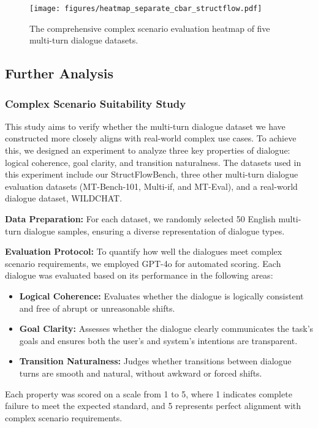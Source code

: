 \begin{figure*}[htbp]
    \captionsetup{skip=0pt}
	\centering
	\texttt{[image: figures/heatmap\_separate\_cbar\_structflow.pdf]}
	\caption{The comprehensive complex scenario evaluation heatmap of five multi-turn dialogue datasets.}
	\label{fig:heatmap}
\end{figure*}

\subsection{Further Analysis}

\subsubsection{Complex Scenario Suitability Study}
This study aims to verify whether the multi-turn dialogue dataset we have constructed more closely aligns with real-world complex use cases.
To achieve this, we designed an experiment to analyze three key properties of dialogue: logical coherence, goal clarity, and transition naturalness. 
The datasets used in this experiment include our StructFlowBench, three other multi-turn dialogue evaluation datasets (MT-Bench-101, Multi-if, and MT-Eval), and a real-world dialogue dataset, WILDCHAT.

\textbf{Data Preparation:} For each dataset, we randomly selected 50 English multi-turn dialogue samples, ensuring a diverse representation of dialogue types.

\textbf{Evaluation Protocol:} To quantify how well the dialogues meet complex scenario requirements, we employed GPT-4o for automated scoring. 
Each dialogue was evaluated based on its performance in the following areas:
\vspace{-.1in}
\begin{itemize}
    \setlength{\itemsep}{0pt}
    \setlength{\parskip}{0pt}
    \item \textbf{Logical Coherence:} Evaluates whether the dialogue is logically consistent and free of abrupt or unreasonable shifts.
    \item \textbf{Goal Clarity:} Assesses whether the dialogue clearly communicates the task's goals and ensures both the user’s and system’s intentions are transparent.
    \item \textbf{Transition Naturalness:} Judges whether transitions between dialogue turns are smooth and natural, without awkward or forced shifts.
\end{itemize}
\vspace{-.1in}
Each property was scored on a scale from 1 to 5, where 1 indicates complete failure to meet the expected standard, and 5 represents perfect alignment with complex scenario requirements.

